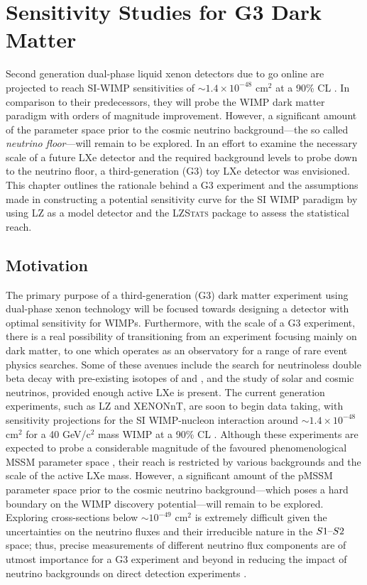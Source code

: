 \chapter{Sensitivity Studies for G3 Dark Matter}
\label{chap:chap6}

Second generation dual-phase liquid xenon detectors due to go online are projected to reach SI-WIMP sensitivities of $\sim1.4 \times 10^{-48}$ cm$^{2}$ at a 90\% CL \cite{akerib2018projected, xenon_1t}. In comparison to their predecessors, they will probe the WIMP dark matter paradigm with orders of magnitude improvement. However, a significant amount of the parameter space prior to the cosmic neutrino background---the so called \textit{neutrino floor}---will remain to be explored. In an effort to examine the necessary scale of a future LXe detector and the required background levels to probe down to the neutrino floor, a third-generation (G3) toy LXe detector was envisioned. This chapter outlines the rationale behind a G3 experiment and the assumptions made in constructing a potential sensitivity curve for the SI WIMP paradigm by using LZ as a model detector and the \textsc{LZStats} package to assess the statistical reach. 


\section{Motivation}
\label{sec:motivation}

The primary purpose of a third-generation (G3) dark matter experiment using dual-phase xenon technology will be focused towards designing a detector with optimal sensitivity for WIMPs. Furthermore, with the scale of a G3 experiment, there is a real possibility of transitioning from an experiment focusing mainly on dark matter, to one which operates as an observatory for a range of rare event physics searches. Some of these avenues include the search for neutrinoless double beta decay with pre-existing isotopes of \XeOTF{} and \XeOTS{}, and the study of solar and cosmic neutrinos, provided enough active LXe is present. The current generation experiments, such as LZ and XENONnT, are soon to begin data taking, with sensitivity projections for the SI WIMP-nucleon interaction around $\sim1.4 \times 10^{-48}$ cm$^{2}$ for a 40 GeV/c$^{2}$ mass WIMP at a 90\% CL \cite{akerib2018projected, Aprile:2020vtw}. Although these experiments are expected to probe a considerable magnitude of the favoured phenomenological MSSM parameter space \cite{pMSSM11}, their reach is restricted by various backgrounds and the scale of the active LXe mass. However, a significant amount of the pMSSM parameter space prior to the cosmic neutrino background---which poses a hard boundary on the WIMP discovery potential---will remain to be explored. Exploring cross-sections below $\sim10^{-49}$ cm$^{2}$ is extremely difficult given the uncertainties on the neutrino fluxes and their irreducible nature in the $S1\text{--}{}S2$ space; thus, precise measurements of different neutrino flux components are of utmost importance for a G3 experiment and beyond in reducing the impact of neutrino backgrounds on direct detection experiments \cite{neutrino_floor}.

